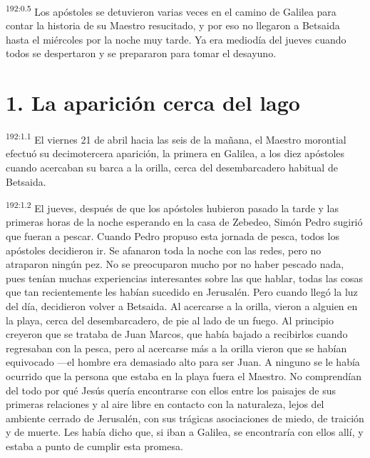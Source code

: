\par 
\textsuperscript{192:0.5} Los apóstoles se detuvieron varias veces en el camino de Galilea para contar la historia de su Maestro resucitado, y por eso no llegaron a Betsaida hasta el miércoles por la noche muy tarde. Ya era mediodía del jueves cuando todos se despertaron y se prepararon para tomar el desayuno.

\section*{1. La aparición cerca del lago}
\par 
\textsuperscript{192:1.1} El viernes 21 de abril hacia las seis de la mañana, el Maestro morontial efectuó su decimotercera aparición, la primera en Galilea, a los diez apóstoles cuando acercaban su barca a la orilla, cerca del desembarcadero habitual de Betsaida.

\par 
\textsuperscript{192:1.2} El jueves, después de que los apóstoles hubieron pasado la tarde y las primeras horas de la noche esperando en la casa de Zebedeo, Simón Pedro sugirió que fueran a pescar. Cuando Pedro propuso esta jornada de pesca, todos los apóstoles decidieron ir. Se afanaron toda la noche con las redes, pero no atraparon ningún pez. No se preocuparon mucho por no haber pescado nada, pues tenían muchas experiencias interesantes sobre las que hablar, todas las cosas que tan recientemente les habían sucedido en Jerusalén. Pero cuando llegó la luz del día, decidieron volver a Betsaida. Al acercarse a la orilla, vieron a alguien en la playa, cerca del desembarcadero, de pie al lado de un fuego. Al principio creyeron que se trataba de Juan Marcos, que había bajado a recibirlos cuando regresaban con la pesca, pero al acercarse más a la orilla vieron que se habían equivocado ---el hombre era demasiado alto para ser Juan. A ninguno se le había ocurrido que la persona que estaba en la playa fuera el Maestro. No comprendían del todo por qué Jesús quería encontrarse con ellos entre los paisajes de sus primeras relaciones y al aire libre en contacto con la naturaleza, lejos del ambiente cerrado de Jerusalén, con sus trágicas asociaciones de miedo, de traición y de muerte. Les había dicho que, si iban a Galilea, se encontraría con ellos allí, y estaba a punto de cumplir esta promesa.

